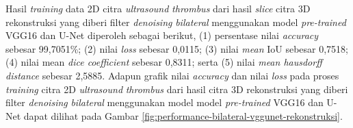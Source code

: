 \begin{enumerate}
	
	Hasil \textit{training} data 2D citra \textit{ultrasound} \textit{thrombus} dari hasil \textit{slice} citra 3D rekonstruksi yang diberi filter \textit{denoising} \textit{bilateral} menggunakan model \textit{pre-trained} VGG16 dan U-Net diperoleh sebagai berikut, (1) persentase nilai \textit{accuracy} sebesar 99,7051\%; (2) nilai \textit{loss} sebesar 0,0115; (3) nilai \textit{mean} IoU sebesar 0,7518; (4) nilai mean \textit{dice coefficient} sebesar 0,8311; serta (5) nilai \textit{mean hausdorff distance} sebesar 2,5885. Adapun grafik nilai \textit{accuracy} dan nilai \textit{loss} pada proses \textit{training} citra 2D \textit{ultrasound} \textit{thrombus} dari hasil citra 3D rekonstruksi yang diberi filter \textit{denoising} \textit{bilateral} menggunakan model model \textit{pre-trained} VGG16 dan U-Net dapat dilihat pada Gambar \ref{fig:performance-bilateral-vggunet-rekonstruksi}.
	

\end{enumerate}
